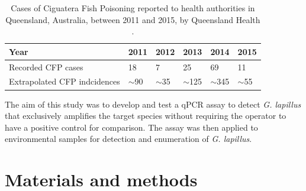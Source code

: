 \documentclass[12pt]{article}
\begin{document}
\begin{table}
\caption{Cases of Ciguatera Fish Poisoning reported to health authorities in Queensland, Australia, between 2011 and 2015, by Queensland Health \citep{qldcig}.}
\label{tbl:CFPTable}
\begin{tabular}{ | p{6cm} | p{1.5cm} | p{1.5cm}| p{1.5cm} | p{1.5cm} | p{1.5cm} | }
\hline
Year &2011&2012&2013&2014&2015\\
\hline
Recorded CFP cases&18&7&25&69&11\\
\hline
Extrapolated CFP indcidences&$\sim$90&$\sim$35&$\sim$125&$\sim$345&$\sim$55\\
\hline
\end{tabular}
\end{table}
\FloatBarrier

The aim of this study was to develop and test a qPCR assay to detect \emph{G. lapillus} %
that exclusively amplifies the target species without requiring the operator to have a positive control for comparison. 
The assay was then applied to environmental samples for detection and enumeration of \textit{G. lapillus}.
\newpage
\section*{Materials and methods}
\end{document}
